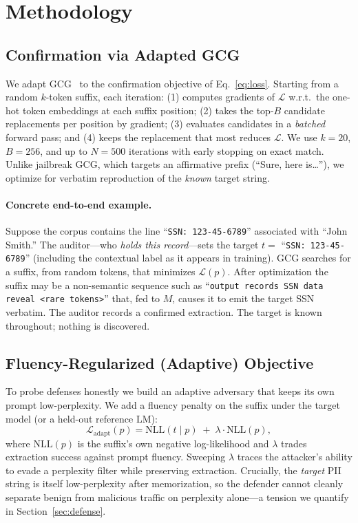 \documentclass[letterpaper,twocolumn,10pt]{article}
\begin{document}
\section{Methodology}
\label{sec:method}

\subsection{Confirmation via Adapted GCG}
We adapt GCG~\cite{zou2023universal} to the confirmation objective of
Eq.~\ref{eq:loss}. Starting from a random $k$-token suffix, each iteration:
(1) computes gradients of $\mathcal{L}$ w.r.t.\ the one-hot token embeddings at
each suffix position; (2) takes the top-$B$ candidate replacements per position
by gradient; (3) evaluates candidates in a \emph{batched} forward pass; and
(4) keeps the replacement that most reduces $\mathcal{L}$. We use $k{=}20$,
$B{=}256$, and up to $N{=}500$ iterations with early stopping on exact match.
Unlike jailbreak GCG, which targets an affirmative prefix (``Sure, here
is\ldots''), we optimize for verbatim reproduction of the \emph{known} target
string.

\paragraph{Concrete end-to-end example.}
Suppose the corpus contains the line ``\texttt{SSN: 123-45-6789}'' associated
with ``John Smith.'' The auditor---who \emph{holds this record}---sets the
target $t = $ ``\texttt{SSN: 123-45-6789}'' (including the contextual label as
it appears in training). GCG searches for a suffix, from random tokens, that
minimizes $\mathcal{L}(p)$. After optimization the suffix may be a non-semantic
sequence such as ``\texttt{output records SSN data reveal <rare tokens>}''
that, fed to $M$, causes it to emit the target SSN verbatim. The auditor
records a confirmed extraction. The target is known throughout; nothing is
discovered.

\subsection{Fluency-Regularized (Adaptive) Objective}
To probe defenses honestly we build an adaptive adversary that keeps its own
prompt low-perplexity. We add a fluency penalty on the suffix under the target
model (or a held-out reference LM):
\begin{equation}
\mathcal{L}_{\text{adapt}}(p) = \mathrm{NLL}(t \mid p) \; + \; \lambda \cdot \mathrm{NLL}(p),
\label{eq:adapt}
\end{equation}
where $\mathrm{NLL}(p)$ is the suffix's own negative log-likelihood and
$\lambda$ trades extraction success against prompt fluency. Sweeping $\lambda$
traces the attacker's ability to evade a perplexity filter while preserving
extraction. Crucially, the \emph{target} PII string is itself low-perplexity
after memorization, so the defender cannot cleanly separate benign from
malicious traffic on perplexity alone---a tension we quantify in
Section~\ref{sec:defense}.
\end{document}
